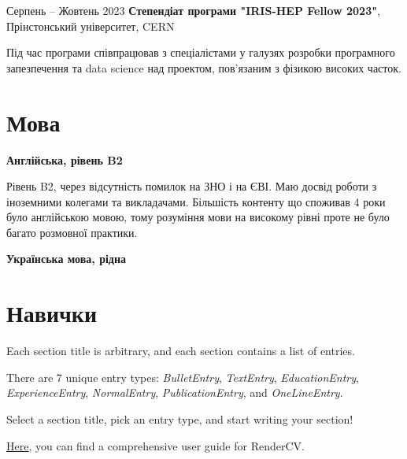 \documentclass[10pt, letterpaper]{article}
\begin{document}
        
        \begin{twocolentry}{
            Серпень – Жовтень 2023
        }
            \textbf{Степендіат програми "IRIS-HEP Fellow 2023"}, Прінстонський університет, CERN \end{twocolentry}

        \vspace{0.10 cm}
        \begin{onecolentry}
            Під час програми співпрацював з спеціалістами у галузях розробки програмного запезпечення та data science над проектом, пов'язаним з фізикою високих часток.
        \end{onecolentry}

    \section{Мова}
        

        \begin{samepage}
            \textbf{Англійська, рівень B2}


            Рівень B2, через відсутність помилок на ЗНО і на ЄВІ. Маю досвід роботи з іноземними колегами та викладачами. Більшість контенту що споживав 4 роки було англійською мовою, тому розуміння мови на високому рівні проте не було багато розмовної практики.


            \textbf{Українська мова, рідна}

        \end{samepage}

    \section{Навички}

            
        \begin{onecolentry}
            \begin{highlightsforbulletentries}


            \item Each section title is arbitrary, and each section contains a list of entries.

            \item There are 7 unique entry types: \textit{BulletEntry}, \textit{TextEntry}, \textit{EducationEntry}, \textit{ExperienceEntry}, \textit{NormalEntry}, \textit{PublicationEntry}, and \textit{OneLineEntry}.

            \item Select a section title, pick an entry type, and start writing your section!

            \item \href{https://docs.rendercv.com/user_guide/}{Here}, you can find a comprehensive user guide for RenderCV.


            \end{highlightsforbulletentries}
        \end{onecolentry}
\end{document}
